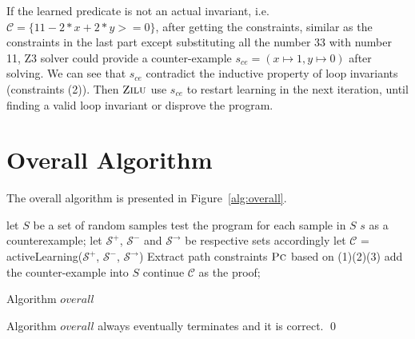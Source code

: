If the learned predicate is not an actual invariant, i.e. $\mathcal{C} = \{11-2*x+2*y>=0\}$,
after getting the constraints, similar as the constraints in the last part except substituting all the number 33 with number 11, 
Z3 solver could provide a counter-example $s_{ce} = (x \mapsto 1, y \mapsto 0)$ after solving.
We can see that $s_{ce}$ contradict the inductive property of loop invariants (constraints (2)).
Then $\textsc{Zilu}$ use $s_{ce}$ to restart learning in the next iteration, until finding a valid loop invariant or disprove the program.


\section {Overall Algorithm}
\label{sec:overall}
The overall algorithm is presented in Figure~\ref{alg:overall}.
\begin{algorithm}[!h]
\SetAlgoVlined
\Indm
{}
\Indp
let $S$ be a set of random samples\;
 {
    test the program for each sample in $S$\;
     {
        \Return $s$ as a counterexample;
    }
    let $\mathcal{S}^+$, $\mathcal{S}^-$ and $\mathcal{S}^\rightarrow$ be respective sets accordingly\;
    let $\mathcal{C}$ = activeLearning($\mathcal{S}^+$, $\mathcal{S}^-$, $\mathcal{S}^\rightarrow$)\;
    Extract path constraints $\textsc{Pc}$ based on (1)(2)(3)\;
     {
         {
            add the counter-example into $S$\;
            continue\;
        }
    }
    \Return $\mathcal{C}$ as the proof;
}
\caption{Algorithm $overall$}
\label{alg:overall}
\end{algorithm}





\begin{theorem}
Algorithm $overall$ always eventually terminates and it is correct. \hfill \qed
\end{theorem}


